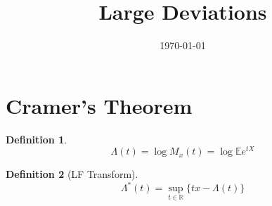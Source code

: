 \documentclass[11pt]{article}
\theoremstyle{break}
\newtheorem{definition}{Definition}[section]
\newcommand{\re}{{\mathbb{R}}}
\newcommand{\ep}{{\mathbb{E}}}
\begin{document}
\title{Large Deviations}

\date{\today}

\maketitle

\section{Cramer's Theorem}

\begin{definition}
\begin{equation}
\Lambda(t) = \log{M_x(t)} = \log{\ep{e^{tX}}}
\end{equation}
\end{definition}

\begin{definition}[LF Transform]

\begin{equation}
\Lambda^*(t) = \sup_{t\in\re}\{tx - \Lambda(t)\}
\end{equation}
\end{definition}
\end{document}
